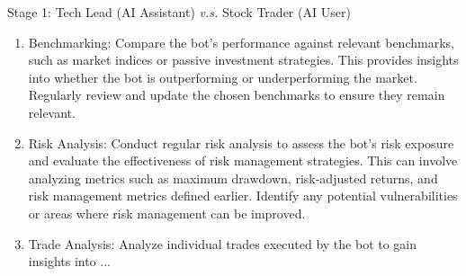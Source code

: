 \begin{AIBoxBreak}{Stage 1: Tech Lead (AI Assistant) \textit{v.s.} Stock Trader (AI User)}
\begin{enumerate}
\item  Benchmarking: Compare the bot’s performance against relevant benchmarks, such as market indices or passive investment strategies. This provides insights into whether the bot is outperforming or underperforming the market. Regularly review and update the chosen benchmarks to ensure they remain relevant.

\item  Risk Analysis: Conduct regular risk analysis to assess the bot’s risk exposure and evaluate the effectiveness of risk management strategies. This can involve analyzing metrics such as maximum drawdown, risk-adjusted returns, and risk management metrics defined earlier. Identify any potential vulnerabilities or areas where risk management can be improved.

\item  Trade Analysis: Analyze individual trades executed by the bot to gain insights into ...
\end{enumerate}
\end{AIBoxBreak}